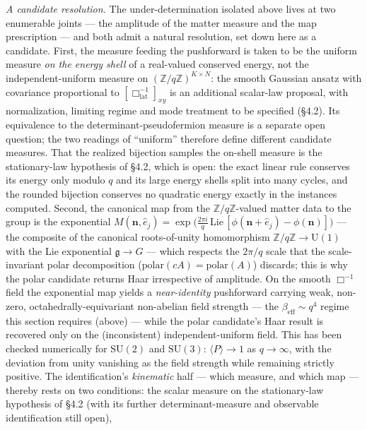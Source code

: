 \documentclass[
]{article}
\begin{document}
\emph{A candidate resolution.} The under-determination isolated above
lives at two enumerable joints --- the amplitude of the matter measure
and the map prescription --- and both admit a natural resolution, set
down here as a candidate. First, the measure feeding the pushforward is
taken to be the uniform measure \emph{on the energy shell} of a
real-valued conserved energy, not the independent-uniform measure on
\((\mathbb{Z}/q\mathbb{Z})^{K \times N}\): the smooth Gaussian ansatz
with covariance proportional to \([\Box_{\text{lat}}^{-1}]_{xy}\) is an
additional scalar-law proposal, with normalization, limiting regime and
mode treatment to be specified (§4.2). Its equivalence to the
determinant-pseudofermion measure is a separate open question; the two
readings of ``uniform'' therefore define different candidate measures.
That the realized bijection samples the on-shell measure is the
stationary-law hypothesis of §4.2, which is open: the exact linear rule
conserves its energy only modulo \(q\) and its large energy shells split
into many cycles, and the rounded bijection conserves no quadratic
energy exactly in the instances computed. Second, the canonical map from
the \(\mathbb{Z}/q\mathbb{Z}\)-valued matter data to the group is the
exponential
\(M(\mathbf{n}, \hat e_j) = \exp\!\big(\tfrac{2\pi i}{q}\,\mathrm{Lie}\,[\phi(\mathbf{n}+\hat e_j) - \phi(\mathbf{n})]\big)\)
--- the composite of the canonical roots-of-unity homomorphism
\(\mathbb{Z}/q\mathbb{Z} \to \mathrm{U}(1)\) with the Lie exponential
\(\mathfrak{g} \to G\) --- which respects the \(2\pi/q\) scale that the
scale-invariant polar decomposition
(\(\mathrm{polar}(cA) = \mathrm{polar}(A)\)) discards; this is why the
polar candidate returns Haar irrespective of amplitude. On the smooth
\(\Box^{-1}\) field the exponential map yields a \emph{near-identity}
pushforward carrying weak, non-zero, octahedrally-equivariant
non-abelian field strength --- the \(\beta_{\text{eff}} \sim q^4\)
regime this section requires (above) --- while the polar candidate's
Haar result is recovered only on the (inconsistent) independent-uniform
field. This has been checked numerically for \(\mathrm{SU}(2)\) and
\(\mathrm{SU}(3)\): \(\langle P \rangle \to 1\) as \(q \to \infty\),
with the deviation from unity vanishing as the field strength while
remaining strictly positive. The identification's \emph{kinematic} half
--- which measure, and which map --- thereby rests on two conditions:
the scalar measure on the stationary-law hypothesis of §4.2 (with its
further determinant-measure and observable identification still open),
\end{document}
